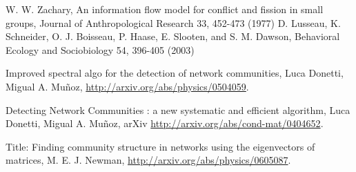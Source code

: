 \documentclass[12pt]{article}
\begin{document}
\clearpage
\begin{thebibliography}{2}
 W. W. Zachary, An information flow model for conflict and fission in small groups, Journal of Anthropological Research 33, 452-473 (1977)
 D. Lusseau, K. Schneider, O. J. Boisseau, P. Haase, E. Slooten, and S. M. Dawson, Behavioral Ecology and Sociobiology 54, 396-405 (2003)

 Improved spectral algo for the detection of network
  communities, Luca Donetti, Migual A. Mu\~noz, \url{http://arxiv.org/abs/physics/0504059}.

 Detecting Network Communities : a new systematic and
  efficient algorithm, Luca Donetti, Migual A. Mu\~noz, arXiv \url{http://arxiv.org/abs/cond-mat/0404652}.

 Title: Finding community structure in networks using the
  eigenvectors of matrices, M. E. J. Newman,
  \url{http://arxiv.org/abs/physics/0605087}.

\end{thebibliography}
\end{document}
